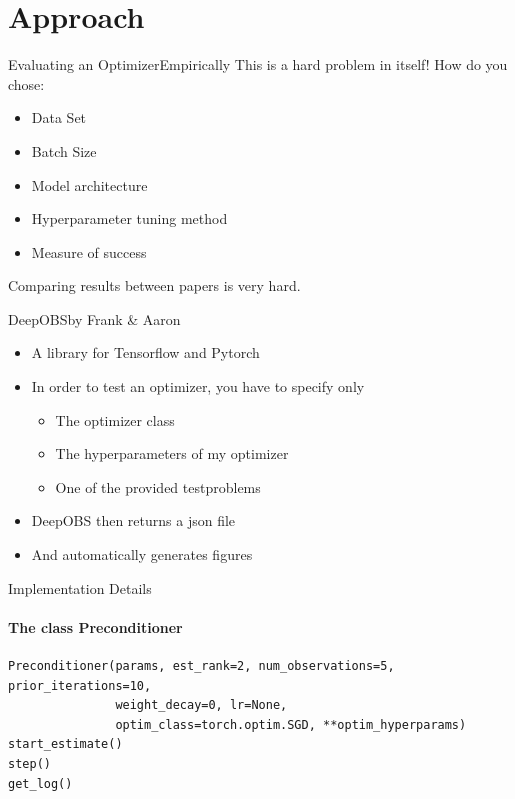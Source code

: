 \documentclass[10pt,usepdftitle=false,aspectratio=169]{beamer}
\begin{document}
\section{Approach}
\begin{frame}{Evaluating an Optimizer}{Empirically}
	This is a hard problem in itself! How do you chose:
	\begin{itemize}
		\item Data Set
		\item Batch Size
		\item Model architecture
		\item Hyperparameter tuning method
		\item Measure of success
	\end{itemize}
	Comparing results between papers is very hard.
\end{frame}

\begin{frame}{DeepOBS}{by Frank \& Aaron}
	\begin{itemize}
		\item A library for Tensorflow and Pytorch
		\item In order to test an optimizer, you have to specify only
			\begin{itemize}
			\item The optimizer class
			\item The hyperparameters of my optimizer
			\item One of the provided testproblems
			\end{itemize}
		\item DeepOBS then returns a json file
		\item And automatically generates figures
	\end{itemize}
\end{frame}

\begin{frame}[fragile]{Implementation Details}
	\framesubtitle{The class Preconditioner}
\begin{verbatim}
Preconditioner(params, est_rank=2, num_observations=5, prior_iterations=10,
               weight_decay=0, lr=None,
               optim_class=torch.optim.SGD, **optim_hyperparams)
start_estimate()
step()
get_log()
\end{verbatim}	
\end{frame}
\end{document}
